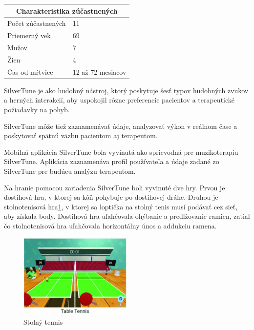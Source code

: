 \documentclass[10pt,twoside,slovak,a4paper]{article}
\begin{document}
\begin{tabular}{ |p{3cm}|p{3cm}| }
\hline
\multicolumn{2}{|c|}{Charakteristika zúčastnených} \\
\hline
Počet zúčastnených & 11 \\
\hline
Priemerný vek & 69 \\
\hline
Mužov & 7 \\
\hline
Žien & 4 \\
\hline
Čas od mŕtvice & 12 až 72 mesiacov \\
\hline
\end{tabular}
\newline
\newline
\newline
SilverTune je ako hudobný nástroj, ktorý poskytuje šesť typov hudobných zvukov a herných interakcií, aby uspokojil rôzne preferencie pacientov a terapeutické požiadavky na pohyb. 

SilverTune môže tiež zaznamenávať údaje, analyzovať výkon v reálnom čase a poskytovať spätnú väzbu pacientom aj terapeutom.

Mobilná aplikácia SilverTune bola vyvinutá ako sprievodná pre muzikoterapiu SilverTune. Aplikácia zaznamenáva profil používateľa a údaje zadané zo SilverTune pre budúcu analýzu terapeutom. 

Na hranie pomocou zariadenia SilverTune boli vyvinuté dve hry. Prvou je dostihová hra, v ktorej sa kôň pohybuje po dostihovej dráhe. Druhou je stolnotenisová hra\ref{fig:SilverTune Stolný tennis}, v ktorej sa loptička na stolný tenis musí podávať cez sieť, aby získala body. Dostihová hra uľahčovala ohýbanie a predlžovanie ramien, zatiaľ čo stolnotenisová hra uľahčovala horizontálny únos a addukciu ramena.

\begin{figure}
    \centering
    \includegraphics[width = 0.5\textwidth]{obrazky/table_tennnis.png}
    \caption{Stolný tennis}
    \label{fig:SilverTune Stolný tennis}
\end{figure}
\end{document}
